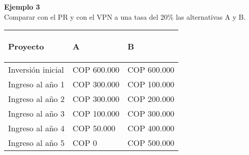 \textbf{Ejemplo 3}\\
Comparar con el PR y con el VPN a una tasa del 20\% las alternativas A y B.

\begin{center}
	\begin{tabular}{ |p{3cm}|p{3cm}|p{3cm}| }
		\hline
		\rowcolor{white!50}              %
		\begin{center}\textbf{Proyecto} \end{center} & \begin{center} \textbf{A}\end{center} & \begin{center} \textbf{B} \end{center} \\ \hline
		
		Inversión inicial          &   COP   600.000          &   COP 600.000          \\ \hline
		
		Ingreso al año 1           &   COP   300.000          &   COP 100.000          \\ \hline
		
		Ingreso al año 2           &   COP   300.000          &   COP 200.000          \\ \hline
		
		Ingreso al año 3           &   COP   100.000          &   COP 300.000          \\ \hline
		
		Ingreso al año 4           &   COP   50.000           &   COP 400.000          \\ \hline
		
		Ingreso al año 5           &   COP   0                &   COP 500.000          \\ \hline
	\end{tabular}
\end{center}


